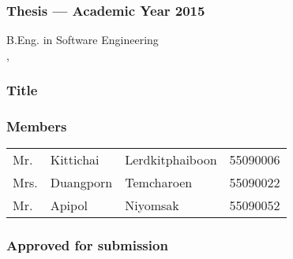 \thispagestyle{empty}

\begin{flushleft}
\subsubsection{\Large{Thesis --- Academic Year 2015}}
B.Eng. in Software Engineering \\
\IC, \kmitl

\vspace{2cm}

\subsubsection{\Large{Title}}
\dms

\vspace{1cm}
\subsubsection{\Large{Members}}
\begin{tabular}{llll}
	Mr. & Kittichai & Lerdkitphaiboon & 55090006 \\
	Mrs. & Duangporn & Temcharoen & 55090022 \\
	Mr. & Apipol & Niyomsak & 55090052 \\
\end{tabular}
\end{flushleft}

\vfill

\begin{flushright}
\subsubsection{\Large{Approved for submission}}
\vspace{1cm}
\end{flushright}